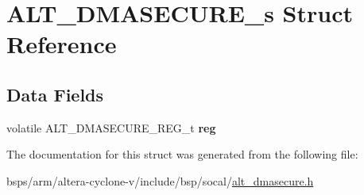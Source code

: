 \hypertarget{structALT__DMASECURE__s}{}\section{A\+L\+T\+\_\+\+D\+M\+A\+S\+E\+C\+U\+R\+E\+\_\+s Struct Reference}
\label{structALT__DMASECURE__s}
\subsection*{Data Fields}
\begin{DoxyCompactItemize}
\item 
\mbox{\label{structALT__DMASECURE__s_ac51fabfe24125f54dee31011cc8f5b1a}} 
volatile A\+L\+T\+\_\+\+D\+M\+A\+S\+E\+C\+U\+R\+E\+\_\+\+R\+E\+G\+\_\+t {\bfseries reg}
\end{DoxyCompactItemize}


The documentation for this struct was generated from the following file\+:\begin{DoxyCompactItemize}
\item 
bsps/arm/altera-\/cyclone-\/v/include/bsp/socal/\mbox{\hyperlink{alt__dmasecure_8h}{alt\+\_\+dmasecure.\+h}}\end{DoxyCompactItemize}
